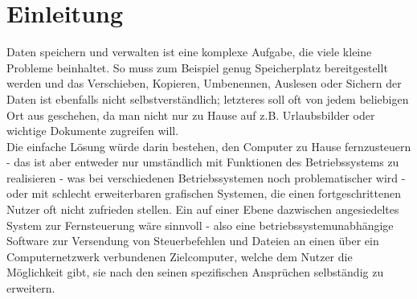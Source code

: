 %

%
\section*{Einleitung}
Daten speichern und verwalten ist eine komplexe Aufgabe, die viele kleine Probleme beinhaltet. So muss zum Beispiel genug Speicherplatz bereitgestellt werden und das Verschieben, Kopieren, Umbenennen, Auslesen oder Sichern der Daten ist ebenfalls nicht selbstverständlich; letzteres soll oft von jedem beliebigen Ort aus geschehen, da man nicht nur zu Hause auf z.B. Urlaubsbilder oder wichtige Dokumente zugreifen will.\\
Die einfache Lösung würde darin bestehen, den Computer zu Hause fernzusteuern - das ist aber entweder nur umständlich mit Funktionen des Betriebssystems zu realisieren - was bei verschiedenen Betriebssystemen noch problematischer wird - oder mit schlecht erweiterbaren grafischen Systemen, die einen fortgeschrittenen Nutzer oft nicht zufrieden stellen.
Ein auf einer Ebene dazwischen angesiedeltes System zur Fernsteuerung wäre sinnvoll - also eine betriebssystemunabhängige Software zur Versendung von Steuerbefehlen und Dateien an einen über ein Computernetzwerk verbundenen Zielcomputer, welche dem Nutzer die Möglichkeit gibt, sie nach den seinen spezifischen Ansprüchen selbständig zu erweitern.

